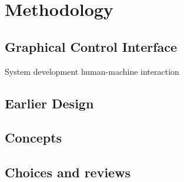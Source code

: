 \chapter{Methodology}


\section{Graphical Control Interface}
System development
human-machine interaction

\section{Earlier Design}

\section{Concepts}

\section{Choices and reviews}

